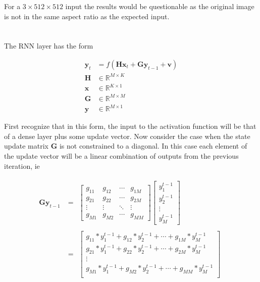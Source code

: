 \documentclass[12pt]{article}
\begin{document}
For a $3 \times 512 \times 512$ input the results would be questionable as the
original image is not in the same aspect ratio as the expected input.

\section{}

The RNN layer has the form

\begin{align}
	\boldsymbol{y}_t &= f(\boldsymbol{H}\boldsymbol{x}_t +
	\boldsymbol{G}\boldsymbol{y}_{t-1} + \boldsymbol{v}) \\
	\boldsymbol{H} &\in \mathbb{R}^{M \times K} \\
	\boldsymbol{x} &\in \mathbb{R}^{K \times 1} \\
	\boldsymbol{G} &\in \mathbb{R}^{M \times M} \\
	\boldsymbol{y} &\in \mathbb{R}^{M \times 1}
\end{align}

First recognize that in this form, the input to the activation function will be
that of a dense layer plus some update vector.
Now consider the case when the state update matrix $\boldsymbol{G}$ is not
constrained to a diagonal. In this case each element of the update vector will
be a linear combination of outputs from the previous iteration, ie

\begin{align}
	\boldsymbol{G}\boldsymbol{y}_{t-1}
	&=
	\begin{aligned}
		\begin{bmatrix}
			g_{11} & g_{12} & \cdots & g_{1M} \\
			g_{21} & g_{22} & \cdots & g_{2M} \\
			\vdots & \vdots & \ddots & \vdots \\
			g_{M1} & g_{M2} & \cdots & g_{MM}
		\end{bmatrix}
		\begin{bmatrix}
			y^{t-1}_{1} \\
			y^{t-1}_{2} \\
			\vdots \\
			y^{t-1}_{M}
		\end{bmatrix}
	\end{aligned}
	\\
	&=
	\begin{aligned}
		\begin{bmatrix}
			g_{11}*y^{t-1}_{1} + g_{12}*y^{t-1}_{2} + \cdots + g_{1M}*y^{t-1}_{M} \\
			g_{21}*y^{t-1}_{1} + g_{22}*y^{t-1}_{2} + \cdots + g_{2M}*y^{t-1}_{M} \\
			\vdots \\
			g_{M1}*y^{t-1}_{1} + g_{M2}*y^{t-1}_{2} + \cdots + g_{MM}*y^{t-1}_{M} \\
		\end{bmatrix}
	\end{aligned}
\end{align}
\end{document}
